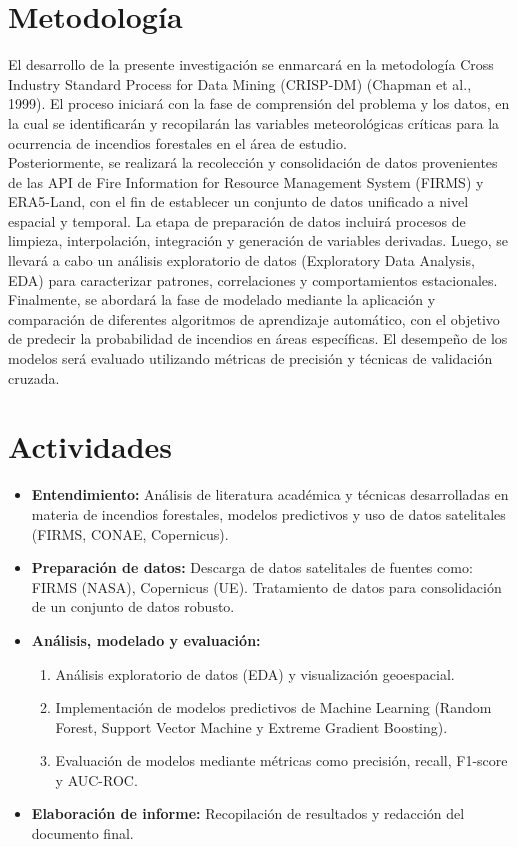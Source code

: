 \section{Metodología}
El desarrollo de la presente investigación se enmarcará en la metodología Cross Industry Standard Process for Data Mining (CRISP-DM) (Chapman et al., 1999). El proceso iniciará con la fase de comprensión del problema y los datos, en la cual se identificarán y recopilarán las variables meteorológicas críticas para la ocurrencia de incendios forestales en el área de estudio. \\

Posteriormente, se realizará la recolección y consolidación de datos provenientes de las API de Fire Information for Resource Management System (FIRMS) y ERA5-Land, con el fin de establecer un conjunto de datos unificado a nivel espacial y temporal. La etapa de preparación de datos incluirá procesos de limpieza, interpolación, integración y generación de variables derivadas. Luego, se llevará a cabo un análisis exploratorio de datos (Exploratory Data Analysis, EDA) para caracterizar patrones, correlaciones y comportamientos estacionales. \\

Finalmente, se abordará la fase de modelado mediante la aplicación y comparación de diferentes algoritmos de aprendizaje automático, con el objetivo de predecir la probabilidad de incendios en áreas específicas. El desempeño de los modelos será evaluado utilizando métricas de precisión y técnicas de validación cruzada.

\section{Actividades}
\begin{itemize}
    \item \textbf{Entendimiento:} Análisis de literatura académica y técnicas desarrolladas en materia de incendios forestales, modelos predictivos y uso de datos satelitales (FIRMS, CONAE, Copernicus). \\ 
    \item \textbf{Preparación de datos:} Descarga de datos satelitales de fuentes como: FIRMS (NASA), Copernicus (UE). Tratamiento de datos para consolidación de un conjunto de datos robusto. \\
    \item \textbf{Análisis, modelado y evaluación:} 
        \begin{enumerate}
            \item Análisis exploratorio de datos (EDA) y visualización geoespacial.  
            \item Implementación de modelos predictivos de Machine Learning (Random Forest, Support Vector Machine y Extreme Gradient Boosting).
            \item Evaluación de modelos mediante métricas como precisión, recall, F1-score y AUC-ROC. \\
        \end{enumerate}
    \item \textbf{Elaboración de informe:} Recopilación de resultados y redacción del documento final.  
\end{itemize}